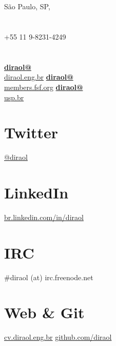 \documentclass[]{friggeri-cv}
\begin{document}
\thispagestyle{empty}
%
%

%
%
\begin{aside}
  \section{}
    São Paulo, SP, 
    ~
  \section{}
    +55 11 9-8231-4249
    ~
  \section{}
    \href{mailto:diraol@diraol.eng.br}{\textbf{diraol@}\\diraol.eng.br}
    \href{mailto:diraol@members.fsf.org}{\textbf{diraol@}\\members.fsf.org}
    \href{mailto:diraol@usp.br}{\textbf{diraol@}\\usp.br}
    ~
  \section{Twitter}
    \href{http://twitter.com/diraol}{@diraol}
    ~
  \section{LinkedIn}
    \href{http://br.linkedin.com/in/diraol}{br.linkedin.com/in/diraol}
    ~
  \section{IRC}
    \#diraol (at) irc.freenode.net
    ~
  \section{Web \& Git}
    \href{http://cv.diraol.eng.br}{cv.diraol.eng.br}
    \href{https://github.com/diraol}{github.com/diraol}
    ~

\end{aside}
\end{document}
